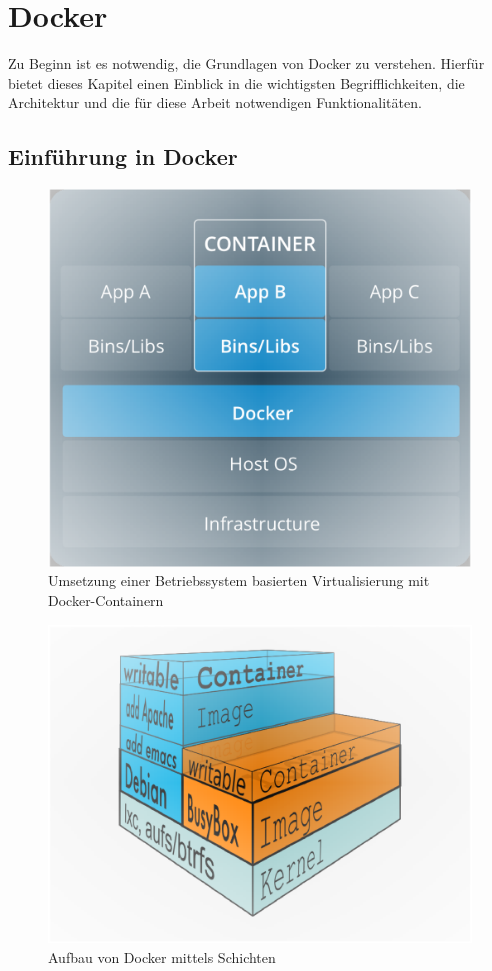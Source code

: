 \chapter{Docker}
\label{c:docker}

Zu Beginn ist es notwendig, die Grundlagen von Docker zu verstehen.
Hierfür bietet dieses Kapitel einen Einblick in die wichtigsten Begrifflichkeiten, die Architektur und die für diese Arbeit notwendigen Funktionalitäten.

\section{Einführung in Docker}
\label{c:einführung}

\begin{figure}
	\centering
	\includegraphics[width=0.7\linewidth]{figures/Docker}
	\caption[Betriebssystem Virtualisierung mit Docker-Containern]{Umsetzung einer Betriebssystem basierten Virtualisierung mit Docker-Containern}
	\label{fig:docker}
\end{figure}

\begin{figure}
	\centering
	\includegraphics[width=0.7\linewidth]{figures/DockerLayer}
	\caption[Aufbau von Docker mittels Schichten]{Aufbau von Docker mittels Schichten}
	\label{fig:dockerlayer}
\end{figure}


